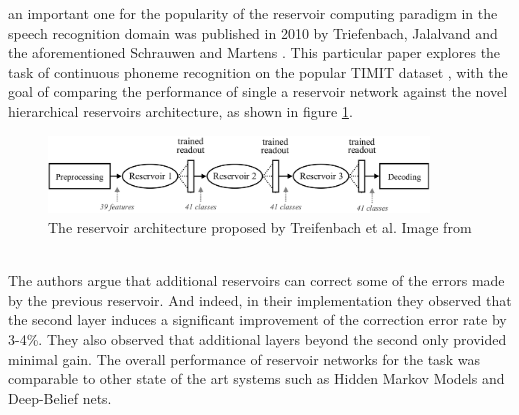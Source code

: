 \documentclass[12pt,oneside]{CUNY_CS_PhD}
\begin{document}
an important one for the popularity of the reservoir computing paradigm in the speech recognition domain was published in 2010 by Triefenbach, Jalalvand and the aforementioned Schrauwen and Martens \cite{triefenbach_phoneme_2010}. This particular paper explores the task of continuous phoneme recognition on the popular TIMIT dataset \cite{timit}, with the goal of comparing the performance of single a reservoir network against the novel hierarchical reservoirs architecture, as shown in figure \ref{fig:layered-res}.
\begin{figure}[!htbp]
\centering
\includegraphics[width=0.9\textwidth]{pictures/layered-res.png}
\caption{The reservoir architecture proposed by Treifenbach et al. Image from \cite{triefenbach_phoneme_2010}}
\label{fig:layered-res}
\end{figure}\\
The authors argue that additional reservoirs can correct some of the errors made by the previous reservoir. And indeed, in their implementation they observed that the second layer induces a significant improvement of the correction error rate by 3-4\%. They also observed that additional layers beyond the second only provided minimal gain. The overall performance of reservoir networks for the task was comparable to other state of the art systems such as Hidden Markov Models and Deep-Belief nets. 
\end{document}
